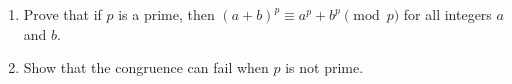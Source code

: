 \begin{enumerate}
\item[(a)] Prove that if $p$ is a prime, then $(a+b)^p\equiv a^p+b^p\pmod p$ for all integers $a$ and $b$.
\item[(b)] Show that the congruence can fail when $p$ is not prime.
\end{enumerate}
